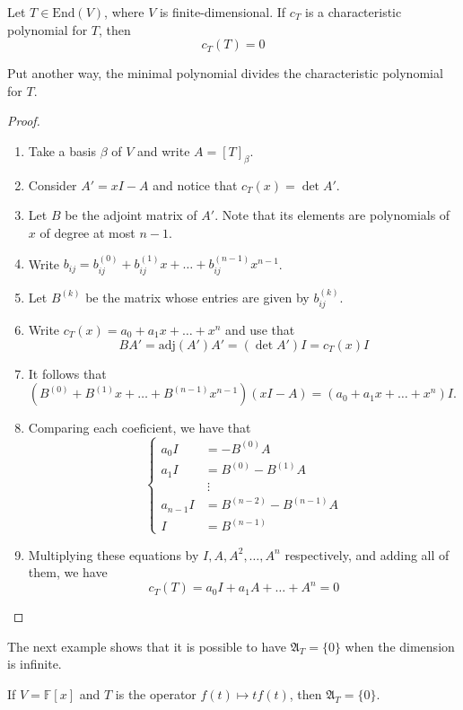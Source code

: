 \begin{theorem}\label{thm:cayley-hamilton}
	Let $T \in \text{End}(V)$, where $V$ is finite-dimensional. If $c_T$ is a characteristic polynomial for $T$, then
	\[
		c_T(T) = 0
	\]

	Put another way, the minimal polynomial divides the characteristic polynomial for $T$.
\end{theorem}

\begin{proof}
	\begin{enumerate}
		\item Take a basis $\beta$ of $V$ and write $A = [T]_\beta$.
		\item Consider $A' = xI - A$ and notice that $c_T(x) = \det A'$.
		\item Let $B$ be the adjoint matrix of $A'$. Note that its elements are polynomials of $x$ of degree at most $n-1$.
		\item Write $b_{ij} = b_{ij}^{(0)} + b_{ij}^{(1)}x + \ldots + b_{ij}^{(n-1)}x^{n-1}$.
		\item Let $B^{(k)}$ be the matrix whose entries are given by $b_{ij}^{(k)}$.
		\item Write $c_T(x) = a_0 + a_1 x + \ldots + x^n$ and use that \[ B A' = \text{adj}(A') A' = (\det A') I = c_T(x) I \]
		\item It follows that $(B^{(0)} + B^{(1)} x + \ldots + B^{(n-1)} x^{n-1})(xI - A) = (a_0 + a_1 x + \ldots + x^n) I$.
		\item Comparing each coeficient, we have that
		\[
			\begin{cases}
				a_0 I &= -B^{(0)}A \\
				a_1 I &= B^{(0)} - B^{(1)}A \\
				&~\vdots \\
				a_{n-1} I &= B^{(n-2)} - B^{(n-1)}A \\
				I &= B^{(n-1)}
			\end{cases}
		\]
		\item Multiplying these equations by $I, A, A^2, \ldots, A^n$ respectively, and adding all of them, we have \[ c_T(T) = a_0 I + a_1 A + \ldots + A^n = 0 \]
	\end{enumerate}
\end{proof}

The next example shows that it is possible to have $\mathfrak{A}_T = \{ 0 \}$ when the dimension is infinite.

\begin{example}
	If $V = \mathbb{F}[x]$ and $T$ is the operator $f(t) \mapsto tf(t)$, then $\mathfrak{A}_T = \{ 0 \}$.
\end{example}

